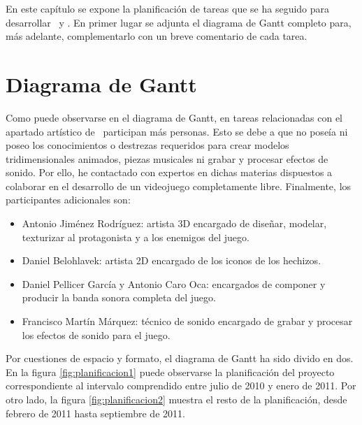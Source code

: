 En este capítulo se expone la planificación de tareas que se ha seguido
para desarrollar \wiki\ y \juego. En primer lugar se adjunta el diagrama
de Gantt completo para, más adelante, complementarlo con un breve comentario de
cada tarea.

\section{Diagrama de Gantt}

Como puede observarse en el diagrama de Gantt, en tareas relacionadas con
el apartado artístico de \juego\ participan más personas. Esto se debe a que
no poseía ni poseo los conocimientos o destrezas requeridos para crear
modelos tridimensionales animados, piezas musicales ni grabar y procesar
efectos de sonido. Por ello, he contactado con expertos en dichas materias
dispuestos a colaborar en el desarrollo de un videojuego completamente libre.
Finalmente, los participantes adicionales son:

\begin{itemize}
    \itemsep0em
    \item Antonio Jiménez Rodríguez: artista 3D encargado de diseñar, modelar,
    texturizar al protagonista y a los enemigos del juego.
    \item Daniel Belohlavek: artista 2D encargado de los iconos de los hechizos.
    \item Daniel Pellicer García y Antonio Caro Oca: encargados de componer
    y producir la banda sonora completa del juego.
    \item Francisco Martín Márquez: técnico de sonido encargado de grabar
    y procesar los efectos de sonido para el juego.
\end{itemize}

Por cuestiones de espacio y formato, el diagrama de Gantt ha sido divido
en dos. En la figura \ref{fig:planificacion1} puede observarse la planificación
del proyecto correspondiente al intervalo comprendido entre julio de 2010
y enero de 2011. Por otro lado, la figura \ref{fig:planificacion2} muestra
el resto de la planificación, desde febrero de 2011 hasta septiembre de 2011.





